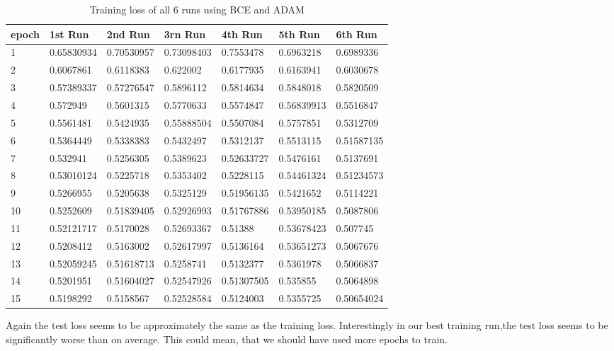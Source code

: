 \begin{table}[!ht]
    \centering
    \begin{tabular}{|l||l||l||l||l||l||l|}
    \hline
    epoch & 1st Run & 2nd Run & 3rn Run & 4th Run & 5th Run & 6th Run \\ \hline
        1 & 0.65830934 & 0.70530957 & 0.73098403 & 0.7553478 & 0.6963218 & 0.6989336 \\ \hline
        2 & 0.6067861 & 0.6118383 & 0.622002 & 0.6177935 & 0.6163941 & 0.6030678 \\ \hline
        3 & 0.57389337 & 0.57276547 & 0.5896112 & 0.5814634 & 0.5848018 & 0.5820509 \\ \hline
        4 & 0.572949 & 0.5601315 & 0.5770633 & 0.5574847 & 0.56839913 & 0.5516847 \\ \hline
        5 & 0.5561481 & 0.5424935 & 0.55888504 & 0.5507084 & 0.5757851 & 0.5312709 \\ \hline
        6 & 0.5364449 & 0.5338383 & 0.5432497 & 0.5312137 & 0.5513115 & 0.51587135 \\ \hline
        7 & 0.532941 & 0.5256305 & 0.5389623 & 0.52633727 & 0.5476161 & 0.5137691 \\ \hline
        8 & 0.53010124 & 0.5225718 & 0.5353402 & 0.5228115 & 0.54461324 & 0.51234573 \\ \hline
        9 & 0.5266955 & 0.5205638 & 0.5325129 & 0.51956135 & 0.5421652 & 0.5114221 \\ \hline
        10 & 0.5252609 & 0.51839405 & 0.52926993 & 0.51767886 & 0.53950185 & 0.5087806 \\ \hline
        11 & 0.52121717 & 0.5170028 & 0.52693367 & 0.51388 & 0.53678423 & 0.507745 \\ \hline
        12 & 0.5208412 & 0.5163002 & 0.52617997 & 0.5136164 & 0.53651273 & 0.5067676 \\ \hline
        13 & 0.52059245 & 0.51618713 & 0.5258741 & 0.5132377 & 0.5361978 & 0.5066837 \\ \hline
        14 & 0.5201951 & 0.51604027 & 0.52547926 & 0.51307505 & 0.535855 & 0.5064898 \\ \hline
        15 & 0.5198292 & 0.5158567 & 0.52528584 & 0.5124003 & 0.5355725 & 0.50654024 \\ \hline
    \end{tabular}
    \caption{\label{tab:bce_adam_train}Training loss of all 6 runs using BCE and ADAM}
\end{table}

Again the test loss seems to be approximately the same as the training loss. Interestingly in our best 
training run,the test loss seems to be significantly worse than on average. This could mean, that we should 
have used more epochs to train. 

